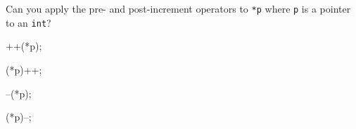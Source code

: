 Can you apply the pre- and post-increment operators to \texttt{*p} where \texttt{p} is a pointer to an \texttt{int}?



\begin{consolethree}[escapeinside=||]

++(*p);



(*p)++;



--(*p);



(*p)--;

\end{consolethree}

